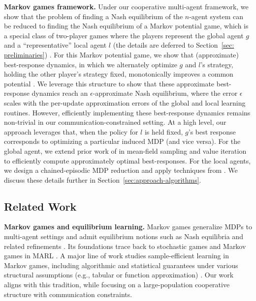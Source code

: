 \textbf{Markov games framework.} Under our cooperative multi-agent framework, we show that the problem of finding a Nash equilibrium of the $n$-agent system can be reduced to finding the Nash equilibrium of a Markov potential
game, which is a special class of two-player games where the players represent the global agent $g$ and a ``representative'' local agent $l$ (the details are deferred to Section~\ref{sec: preliminaries}) \citep{doi:10.1073/pnas.39.10.1095, littman}. For this Markov potential game, we show that (approximate) best-response dynamics, in which we alternately optimize $g$ and $l$'s strategy, holding the other player's strategy fixed, monotonically improves a common potential \citep{chen2022convergencepriceanarchyguarantees}. We leverage this structure to show that these approximate best-response dynamics reach an $\epsilon$-approximate Nash equilibrium, where the error $\epsilon$ scales with the per-update approximation errors of the global and local learning routines.  However, efficiently implementing these best-response dynamics remains non-trivial in our communication-constrained setting. At a high level, our approach leverages that, when the policy for $l$ is held fixed, $g$'s best response corresponds to optimizing a particular induced MDP (and vice versa). For the global agent, we extend prior work of \citet{anand2025meanfield} in mean-field sampling and value iteration to efficiently compute approximately optimal best-responses. For the local agents, we design a chained-episodic MDP reduction and apply techniques from \citet{dann2015sample}. We discuss these details further in Section~\ref{sec:approach-algorithms}.

\subsection{Related Work}

\textbf{Markov games and equilibrium learning.}
Markov games generalize MDPs to multi-agent settings and admit equilibrium notions such as Nash equilibria
and related refinements \cite{NIPS1999_464d828b}. Its foundations trace back to stochastic games \citep{doi:10.1073/pnas.39.10.1095} and Markov games in MARL
\citep{littman}. A major line of work studies sample-efficient learning in Markov games, including algorithmic and
statistical guarantees under various structural assumptions (e.g., tabular or function approximation) \cite{jin2021v,10.5555/3540261.3542236,10.5555/3600270.3600377, bichuch2024stackelberg,10.5555/3586589.3586718}. Our work aligns with
this tradition, while focusing on a large-population cooperative structure with communication constraints.
   
